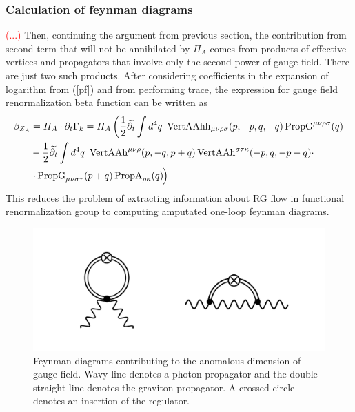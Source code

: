 \documentclass[11pt, a4paper]{article}
\begin{document}
\subsubsection{Calculation of feynman diagrams}
\textcolor{red}{(...)} Then, continuing the argument from previous section, the contribution from second term that will not be annihilated
by $\varPi_A$ comes from products of effective vertices and propagators that involve only the second power of gauge field.
There are just two such products. After considering coefficients in the expansion of logarithm from (\ref{pf}) and from performing trace, the expression for gauge field renormalization beta function can be written as
\begin{align}
    \beta_{Z_A} & = \varPi_A \cdot \partial_t \Gamma_k = \varPi_A \left( \frac{1}{2} \widetilde{\partial_t} \int d^4 q \ \operatorname{VertAAhh}_{\mu\nu\rho\sigma}(p,-p,q,-q) \operatorname{PropG}^{\mu\nu\rho\sigma}(q)\right.\\
    & - \frac{1}{2} \widetilde{\partial_t} \int d^4 q \ \operatorname{VertAAh}^{\mu\nu\rho}(p,-q,p+q) \operatorname{VertAAh}^{\sigma\tau\kappa}(-p,q,-p-q) \cdot \\
    &\left. \cdot \operatorname{PropG}_{\mu\nu\sigma\tau}(p+q) \operatorname{PropA}_{\rho\kappa}(q) \phantom{\frac{}{}} \hspace{-0.35em}\right)
\end{align}
This reduces the problem of extracting information about RG flow in functional renormalization group to computing amputated one-loop feynman diagrams.
\begin{figure}[H]
    \includegraphics[width=1\textwidth]{./figures/diags.png}
    \caption{Feynman diagrams contributing to the anomalous dimension of gauge field. Wavy line denotes a photon propagator
    and the double straight line denotes the graviton propagator. A crossed circle denotes an insertion of the regulator.}
    \label{diags}
\end{figure} 
\end{document}
